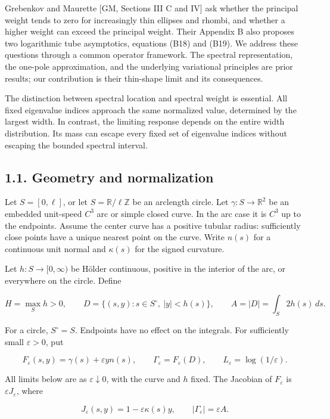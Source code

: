 \documentclass[11pt]{article}
\begin{document}
Grebenkov and Maurette {[}GM, Sections III C and IV{]} ask whether the
principal weight tends to zero for increasingly thin ellipses and
rhombi, and whether a higher weight can exceed the principal weight.
Their Appendix B also proposes two logarithmic tube asymptotics,
equations (B18) and (B19). We address these questions through a common
operator framework. The spectral representation, the one-pole
approximation, and the underlying variational principles are prior
results; our contribution is their thin-shape limit and its
consequences.

The distinction between spectral location and spectral weight is
essential. All fixed eigenvalue indices approach the same normalized
value, determined by the largest width. In contrast, the limiting
response depends on the entire width distribution. Its mass can escape
every fixed set of eigenvalue indices without escaping the bounded
spectral interval.

\subsection{1.1. Geometry and
normalization}\label{geometry-and-normalization}

Let \(S=[0,\ell]\), or let \(S=\mathbb R/\ell\mathbb Z\) be an arclength
circle. Let \(\gamma:S\to\mathbb R^2\) be an embedded unit-speed \(C^3\)
arc or simple closed curve. In the arc case it is \(C^3\) up to the
endpoints. Assume the center curve has a positive tubular radius:
sufficiently close points have a unique nearest point on the curve.
Write \(n(s)\) for a continuous unit normal and \(\kappa(s)\) for the
signed curvature.

Let \(h:S\to[0,\infty)\) be Hölder continuous, positive in the interior
of the arc, or everywhere on the circle. Define

\[
H=\max_S h>0,\qquad
D=\{(s,y):s\in S^\circ,\ |y|<h(s)\},\qquad
A=|D|=\int_S2h(s)\,ds.
\tag{1.2}
\]

For a circle, \(S^\circ=S\). Endpoints have no effect on the integrals.
For sufficiently small \(\varepsilon>0\), put

\[
F_\varepsilon(s,y)=\gamma(s)+\varepsilon y n(s),\qquad
\Gamma_\varepsilon=F_\varepsilon(D),\qquad
L_\varepsilon=\log(1/\varepsilon).
\tag{1.3}
\]

All limits below are as \(\varepsilon\downarrow0\), with the curve and
\(h\) fixed. The Jacobian of \(F_\varepsilon\) is
\(\varepsilon J_\varepsilon\), where

\[
J_\varepsilon(s,y)=1-\varepsilon\kappa(s)y,
\qquad |\Gamma_\varepsilon|=\varepsilon A.
\tag{1.4}
\]
\end{document}
